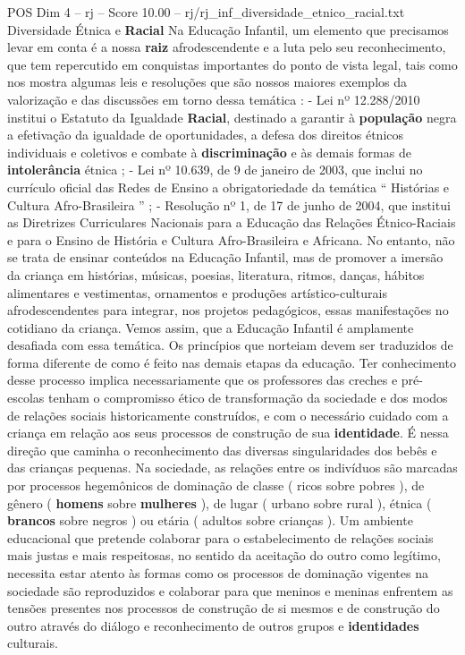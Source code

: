 \begin{textsample}{POS Dim 4 – rj – Score 10.00 – rj/rj\_inf\_diversidade\_etnico\_racial.txt}  \label{ex:f4_pos_164}
Diversidade Étnica e \textbf{Racial} Na Educação Infantil, um elemento que precisamos levar em conta é a nossa \textbf{raiz} afrodescendente e a luta pelo seu reconhecimento, que tem repercutido em conquistas importantes do ponto de vista legal, tais como nos mostra algumas leis e resoluções que são nossos maiores exemplos da valorização e das discussões em torno dessa temática : - Lei nº 12.288/2010 institui o Estatuto da Igualdade \textbf{Racial}, destinado a garantir à \textbf{população} negra a efetivação da igualdade de oportunidades, a defesa dos direitos étnicos individuais e coletivos e combate à \textbf{discriminação} e às demais formas de \textbf{intolerância} étnica ; - Lei nº 10.639, de 9 de janeiro de 2003, que inclui no currículo oficial das Redes de Ensino a obrigatoriedade da temática “ Histórias e Cultura Afro-Brasileira ” ; - Resolução nº 1, de 17 de junho de 2004, que institui as Diretrizes Curriculares Nacionais para a Educação das Relações Étnico-Raciais e para o Ensino de História e Cultura Afro-Brasileira e Africana.
No entanto, não se trata de ensinar conteúdos na Educação Infantil, mas de promover a imersão da criança em histórias, músicas, poesias, literatura, ritmos, danças, hábitos alimentares e vestimentas, ornamentos e produções artístico-culturais afrodescendentes para integrar, nos projetos pedagógicos, essas manifestações no cotidiano da criança.
Vemos assim, que a Educação Infantil é amplamente desafiada com essa temática.
Os princípios que norteiam devem ser traduzidos de forma diferente de como é feito nas demais etapas da educação.
Ter conhecimento desse processo implica necessariamente que os professores das creches e pré-escolas tenham o compromisso ético de transformação da sociedade e dos modos de relações sociais historicamente construídos, e com o necessário cuidado com a criança em relação aos seus processos de construção de sua \textbf{identidade}.
É nessa direção que caminha o reconhecimento das diversas singularidades dos bebês e das crianças pequenas.
Na sociedade, as relações entre os indivíduos são marcadas por processos hegemônicos de dominação de classe ( ricos sobre pobres ), de gênero ( \textbf{homens} sobre \textbf{mulheres} ), de lugar ( urbano sobre rural ), étnica ( \textbf{brancos} sobre negros ) ou etária ( adultos sobre crianças ).
Um ambiente educacional que pretende colaborar para o estabelecimento de relações sociais mais justas e mais respeitosas, no sentido da aceitação do outro como legítimo, necessita estar atento às formas como os processos de dominação vigentes na sociedade são reproduzidos e colaborar para que meninos e meninas enfrentem as tensões presentes nos processos de construção de si mesmos e de construção do outro através do diálogo e reconhecimento de outros grupos e \textbf{identidades} culturais.

\end{textsample}
